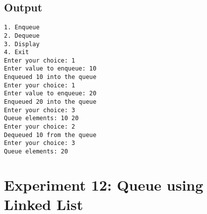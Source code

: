 \documentclass[12pt,a4paper]{article}
\begin{document}
\subsection*{Output}
\begin{tcolorbox}[terminalstyle, title=Sample Output]
\texttt{1. Enqueue\\2. Dequeue\\3. Display\\4. Exit\\
Enter your choice: 1\\
Enter value to enqueue: 10\\
Enqueued 10 into the queue\\
Enter your choice: 1\\
Enter value to enqueue: 20\\
Enqueued 20 into the queue\\
Enter your choice: 3\\
Queue elements: 10 20\\
Enter your choice: 2\\
Dequeued 10 from the queue\\
Enter your choice: 3\\
Queue elements: 20}
\end{tcolorbox}

\newpage
\section*{Experiment 12: Queue using Linked List}
\end{document}

